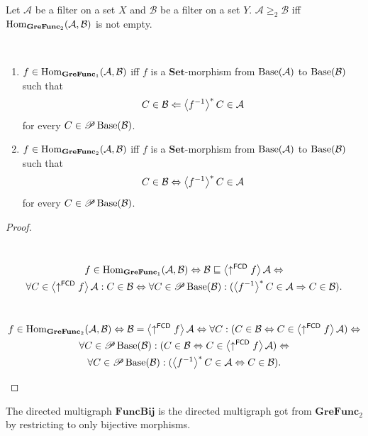 \begin{defn}
Let $\mathcal{A}$ be a filter on a set $X$ and $\mathcal{B}$ be
a filter on a set $Y$. $\mathcal{A}\ge_{2}\mathcal{B}$ iff $\operatorname{Hom}_{\mathbf{GreFunc}_{2}}(\mathcal{A},\mathcal{B})$
is not empty.\end{defn}
\begin{prop}
~
\begin{enumerate}
\item \label{gre-imp}$f\in\operatorname{Hom}_{\mathbf{GreFunc}_{1}}(\mathcal{A},\mathcal{B})$
iff $f$ is a $\mathbf{Set}$-morphism from $\operatorname{Base}(\mathcal{A})$
to $\operatorname{Base}(\mathcal{B})$ such that
\[
C\in\mathcal{B}\Leftarrow\left\langle f^{-1}\right\rangle ^{\ast}C\in\mathcal{A}
\]
for every $C\in\mathscr{P}\operatorname{Base}(\mathcal{B})$.
\item \label{gre-eq}$f\in\operatorname{Hom}_{\mathbf{GreFunc}_{2}}(\mathcal{A},\mathcal{B})$
iff $f$ is a $\mathbf{Set}$-morphism from $\operatorname{Base}(\mathcal{A})$
to $\operatorname{Base}(\mathcal{B})$ such that
\[
C\in\mathcal{B}\Leftrightarrow\left\langle f^{-1}\right\rangle ^{\ast}C\in\mathcal{A}
\]
for every $C\in\mathscr{P}\operatorname{Base}(\mathcal{B})$.
\end{enumerate}
\end{prop}
\begin{proof}
~
\begin{widedisorder}
\item [{\ref{gre-imp}}] ~
\begin{multline*}
f\in\operatorname{Hom}_{\mathbf{GreFunc}_{1}}(\mathcal{A},\mathcal{B})\Leftrightarrow\mathcal{B}\sqsubseteq\left\langle \uparrow^{\mathsf{FCD}}f\right\rangle\mathcal{A}\Leftrightarrow\\
\forall C\in\left\langle \uparrow^{\mathsf{FCD}}f\right\rangle\mathcal{A}:C\in\mathcal{B}\Leftrightarrow\forall C\in\mathscr{P}\operatorname{Base}(\mathcal{B}):(\left\langle f^{-1}\right\rangle ^{\ast}C\in\mathcal{A}\Rightarrow C\in\mathcal{B}).
\end{multline*}

\item [{\ref{gre-eq}}] ~
\begin{multline*}
f\in\operatorname{Hom}_{\mathbf{GreFunc}_{2}}(\mathcal{A},\mathcal{B})\Leftrightarrow\mathcal{B}=\left\langle \uparrow^{\mathsf{FCD}}f\right\rangle\mathcal{A}\Leftrightarrow\forall C:(C\in\mathcal{B}\Leftrightarrow C\in\left\langle \uparrow^{\mathsf{FCD}}f\right\rangle\mathcal{A})\Leftrightarrow\\
\forall C\in\mathscr{P}\operatorname{Base}(\mathcal{B}):(C\in\mathcal{B}\Leftrightarrow C\in\left\langle \uparrow^{\mathsf{FCD}}f\right\rangle\mathcal{A})\Leftrightarrow\\
\forall C\in\mathscr{P}\operatorname{Base}(\mathcal{B}):(\left\langle f^{-1}\right\rangle ^{\ast}C\in\mathcal{A}\Leftrightarrow C\in\mathcal{B}).
\end{multline*}

\end{widedisorder}
\end{proof}
\begin{defn}
The directed multigraph $\mathbf{FuncBij}$ is the directed multigraph
got from $\mathbf{GreFunc}_{2}$ by restricting to only bijective
morphisms.
\end{defn}

